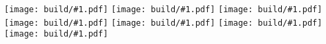 \documentclass{article}
\newcommand{\Include}[1]{\texttt{[image: build/\#1.pdf]}\vspace{1cm}}
\begin{document}
\centering


\Include{abend-wird-es-wieder-b}
\Include{abend-wird-es-wieder-c}
\Include{kein-schoener-land-b}
\Include{klinge-lieblich-b}
\Include{wenn-alle-bruennlein-fliessen-b}
\Include{wenn-ich-ein-voeglein-waer-b}
\Include{wohlauf-in-gottes-schoene-welt-b}
\end{document}
